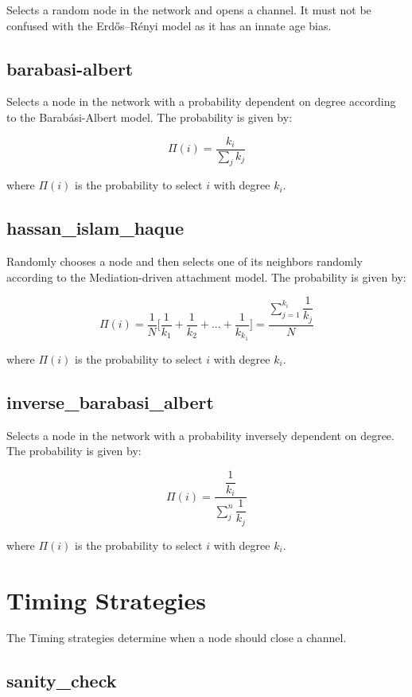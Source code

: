 Selects a random node in the network and opens a channel. It must not be confused with the Erdős–Rényi model as it has an innate age bias.

\subsection*{barabasi-albert}

Selects a node in the network with a probability dependent on degree according to the Barabási-Albert model. The probability is given by:

\[ \Pi(i) = \dfrac{k_i}{\sum_{j}^{}k_j}  \]

where $\Pi(i)$ is the probability to select $i$ with degree $k_i$.

\subsection*{hassan\_islam\_haque}

Randomly chooses a node and then selects one of its neighbors randomly according to the Mediation-driven attachment model. The probability is given by:

\[ \Pi(i) = \dfrac{1}{N} \bigg\lbrack \dfrac{1}{k_1} + \dfrac{1}{k_2} + ... + \dfrac{1}{k_{k_1}} \bigg\rbrack = \dfrac{\sum_{j=1}^{k_i}\dfrac{1}{k_j}}{N} \]

where $\Pi(i)$ is the probability to select $i$ with degree $k_i$.

\subsection*{inverse\_barabasi\_albert}

Selects a node in the network with a probability inversely dependent on degree. The probability is given by:

\[ \Pi(i) =  \dfrac{\dfrac{1}{k_i}}{\sum_{j}^{n} \dfrac{1}{k_j}} \]
 
where $\Pi(i)$ is the probability to select $i$ with degree $k_i$.

\section*{Timing Strategies}
The Timing strategies determine when a node should close a channel.

\subsection*{sanity\_check}

